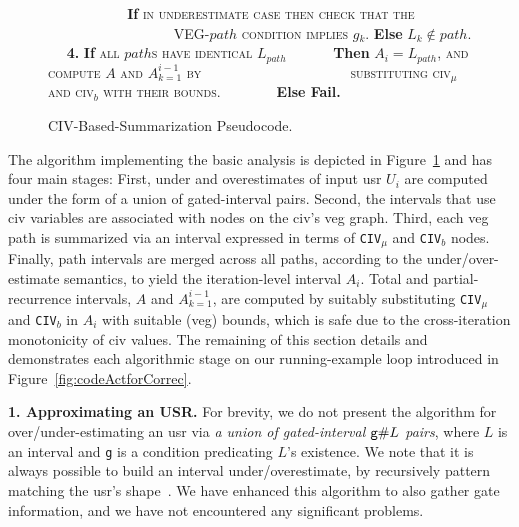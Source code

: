 \documentclass[10pt,nocopyrightspace]{sigplanconf}
\begin{document}
\begin{figure}[t]
\begin{small}
$\mbox{ }\mbox{ }\mbox{ }\mbox{ }\mbox{ }\mbox{ }\mbox{ }\mbox{ }$
           {\bf If} \textsc{in underestimate case} \textsc{then check that the}
$\mbox{ }\mbox{ }\mbox{ }\mbox{ }\mbox{ }\mbox{ }\mbox{ }\mbox{ }\mbox{ }\mbox{ }\mbox{ }\mbox{ }\mbox{ }$
\textsc{VEG-$path$ condition implies $g_k$}. {\bf Else} $L_k \not\in path$.\vspace{2ex}\newline
$\mbox{ }\mbox{ }${\bf4.} {\bf If} \textsc{all $path$s have identical $L_{path}$}\newline 
$\mbox{ }\mbox{ }\mbox{ }\mbox{ }$
            {\bf Then} \textsc{$A_i = L_{path}$, and compute $A$ and $A_{k=1}^{i-1}$ by}\newline 
$\mbox{ }\mbox{ }\mbox{ }\mbox{ }\mbox{ }\mbox{ }\mbox{ }\mbox{ }\mbox{ }\mbox{ }\mbox{ }\mbox{ }\mbox{ }\mbox{ }\mbox{ }$
\textsc{substituting civ$_\mu$ and civ$_b$ with their bounds.}\newline
$\mbox{ }\mbox{ }\mbox{ }\mbox{ }\mbox{ }$ {\bf Else Fail.}\vspace{1ex}
\end{small}
\caption{ CIV-Based-Summarization Pseudocode.}
\label{fig:BasicTechnique} %
\end{figure}


The algorithm implementing the basic analysis is depicted in 
Figure~\ref{fig:BasicTechnique} and has four main stages: 
First, under and overestimates of input {\sc usr} $U_i$ are 
computed under the form of a union of gated-interval pairs.   
Second, the intervals that use {\sc civ} variables are 
associated with nodes on the {\sc civ}'s {\sc veg} graph. 
Third, each {\sc veg} path is summarized via an interval expressed 
in terms of {\tt CIV$_\mu$} and {\tt CIV$_b$} nodes.\\
\noindent Finally, path intervals are merged across all paths, according to 
the under/over-estimate semantics, to yield the iteration-level interval $A_i$.
Total and partial-recurrence intervals, $A$ and $A_{k=1}^{i-1}$, 
are computed by suitably substituting {\tt CIV$_\mu$} and 
{\tt CIV$_b$} in $A_i$ with suitable ({\sc veg}) bounds,
which is safe due to the cross-iteration monotonicity of {\sc civ} values.
The remaining of this section details and demonstrates each algorithmic stage
on our running-example loop introduced in Figure~\ref{fig:codeActforCorrec}.

\vspace{1ex}

{\bf 1. Approximating an USR.} 
For brevity, we do not present the algorithm for
over/under-estimating an {\sc usr} via 
{\em a union of gated-interval ${\tt g}\#L$ pairs}, where $L$ is an 
interval and {\tt g} is a condition predicating $L$'s existence.  
%
We note that it is always possible to build an interval 
under/overestimate, by recursively pattern matching the {\sc usr}'s 
shape~\cite{SummaryMonot}. We have enhanced this algorithm to also 
gather gate information, and we have not encountered any significant problems.
  
\end{document}
